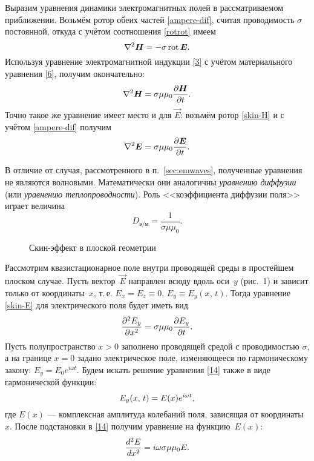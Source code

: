 Выразим уравнения динамики электромагнитных полей в рассматриваемом приближении.
Возьмём ротор обеих частей \eqref{ampere-dif}, считая проводимость $\sigma$ 
постоянной, откуда с учётом соотношения \eqref{rotrot} имеем
\begin{equation*} \eqmark{8}
\nabla^2\vec{H}= -\sigma \Rot \vec{E}.
\end{equation*}
Используя уравнение электромагнитной индукции \eqref{3} с учётом материального 
уравнения \eqref{6}, получим окончательно:
\begin{equation}\eqmark{skin-H}
\nabla^2\vec{H}= \sigma\mu\mu_0 \ddt{\vec{H}}.
\end{equation}
Точно такое же уравнение имеет место и для $\vec{E}$:
возьмём ротор \eqref{skin-H} и с учётом \eqref{ampere-dif} получим
\begin{equation}\eqmark{skin-E}
\nabla^2\vec{E}= \sigma\mu\mu_0 \ddt{\vec{E}}.
\end{equation}

В отличие от случая, рассмотренного в п.~\ref{sec:emwaves}, 
полученные уравнения не являются волновыми. Математически они аналогичны
\emph{уравнению диффузии} (или \emph{уравнению теплопроводности}). Роль 
<<коэффициента диффузии поля>> играет величина
\begin{equation}
D_{э/м} = \frac{1}{\sigma \mu \mu_0}.
\end{equation}


\label{sec:skin}

\begin{wrapfigure}[13]{o}{0.22\textwidth}
    \vspace*{-\baselineskip}
    \caption{Скин-эффект в плоской геометрии}
\end{wrapfigure}
Рассмотрим квазистационарное поле внутри проводящей среды в 
простейшем плоском случае. Пусть вектор~$\vec{E}$ 
направлен всюду вдоль оси~$y$ (рис.~1) и зависит 
только от координаты~$x$, т.\,е. $E_x=E_z\equiv 0$, $E_y\equiv E_y(x,\,t)$. 
Тогда уравнение \eqref{skin-E} для электрического поля будет иметь вид
\begin{equation} \eqmark{14}
\frac{\partial^2E_y}{\partial x^2}= \sigma \mu \mu_0 \ddt{E_y}.
\end{equation}
Пусть полупространство $x>0$ заполнено проводящей средой с проводимостью $\sigma$, 
а на границе $x=0$ задано электрическое поле, изменяющееся по гармоническому закону: 
$E_y=E_0e^{i\omega t}$. Будем
искать решение уравнения \eqref{14} также в виде гармонической функции:
\begin{equation*} \eqmark{15}
E_y(x,\,t)=E(x)e^{i\omega t},
\end{equation*}
где $E(x)$ --- комплексная амплитуда колебаний поля, зависящая от координаты~$x$.
После подстановки в \eqref{14} получим уравнение на функцию~$E(x)$:
\begin{equation} \eqmark{16}
\frac{d^2E}{dx^2}=i\omega\sigma\mu\mu_0 E.
\end{equation}

